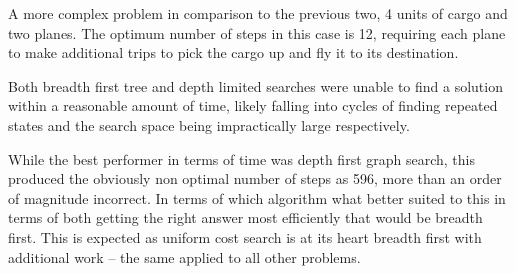\documentclass[11pt]{article}
\begin{document}
A more complex problem in comparison to the previous two, 4 units of cargo and two planes. The optimum number of steps in this case is 12, requiring each plane to make additional trips to pick the cargo up and fly it to its destination.

Both breadth first tree and depth limited searches were unable to find a solution within a reasonable amount of time, likely falling into cycles of finding repeated states and the search space being impractically large respectively.

While the best performer in terms of time was depth first graph search, this produced the obviously non optimal number of steps as 596, more than an order of magnitude incorrect. In terms of which algorithm what better suited to this in terms of both getting the right answer most efficiently that would be breadth first. This is expected as uniform cost search is at its heart breadth first with additional work -- the same applied to all other problems.




\end{document}
